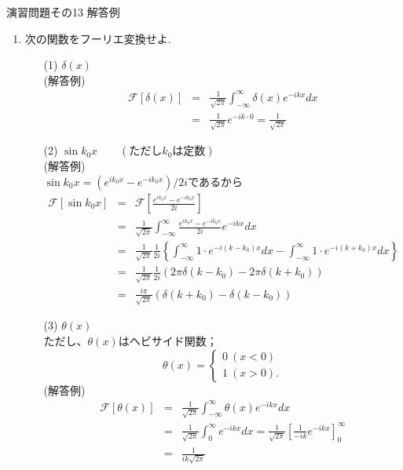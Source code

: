 \documentclass[11pt]{jsarticle}
\begin{document}
\begin{center}
{\Large
演習問題その13  解答例}
\end{center}
\begin{enumerate}


\item 次の関数をフーリエ変換せよ.
\begin{enumerate}
\item[(1)] $\delta (x)$\\
(解答例)
\begin{eqnarray*}
\mathcal{F}[\delta(x)]&=&\frac{1}{\sqrt{2\pi}}\int_{-\infty}^{\infty} \delta(x) e^{-ik x}dx\\
&=&\frac{1}{\sqrt{2\pi}}e^{-ik\cdot 0}=\frac{1}{\sqrt{2\pi}}
\end{eqnarray*}

\item[(2)] $\sin{k_0}x\qquad (ただしk_0は定数)$\\
(解答例)\\
 $\sin k_{0}x=(e^{ik_{0}x}-e^{-ik_{0}x})/2i$であるから
 \begin{eqnarray*}
 \mathcal{F}[\sin k_{0}x]&=&\mathcal{F} \left[ \frac{e^{ik_{0}x}-e^{-ik_{0}x}}{2i} \right]\\
 &=&\frac{1}{\sqrt{2\pi}}\int_{-\infty}^{\infty} \frac{e^{ik_{0}x}-e^{-ik_{0}x}}{2i} e^{-ik x}dx\\
 &=&\frac{1}{\sqrt{2\pi}}\frac{1}{2i}  \left\{  \int_{-\infty}^{\infty}1 \cdot e^{-i(k-k_{0})x}dx - \int_{-\infty}^{\infty}1 \cdot e^{-i(k+k_{0})x}dx\right\}\\
 &=&\frac{1}{\sqrt{2\pi}}\frac{1}{2i}\left( 2\pi\delta(k-k_{0})- 2\pi\delta(k+k_{0})\right)\\
 &=&\frac{i\pi}{\sqrt{2\pi}} (\delta(k+k_{0})-\delta(k-k_{0}))
 \end{eqnarray*}

\item[(3)] $\theta (x)$\\
ただし、$\theta (x)$はヘビサイド関数；\begin{equation*}
 \theta (x) =
   \begin{cases}
    0 \ (x<0)\\
    1 \ (x>0).
  \end{cases}
\end{equation*}
(解答例)
\begin{eqnarray*}
\mathcal{F}[\theta(x)]
&=&\frac{1}{\sqrt{2\pi}}\int_{-\infty}^{\infty} \theta(x) e^{-ik x}dx\\
&=&\frac{1}{\sqrt{2\pi}}\int_{0}^{\infty} e^{-ik x}dx = \frac{1}{\sqrt{2\pi}}\left[ \frac{1}{-ik}e^{-ikx} \right]_0^{\infty}\\
&=& \frac{1}{ik\sqrt{2\pi}}
\end{eqnarray*}



\end{enumerate}
\end{enumerate}
\end{document}
